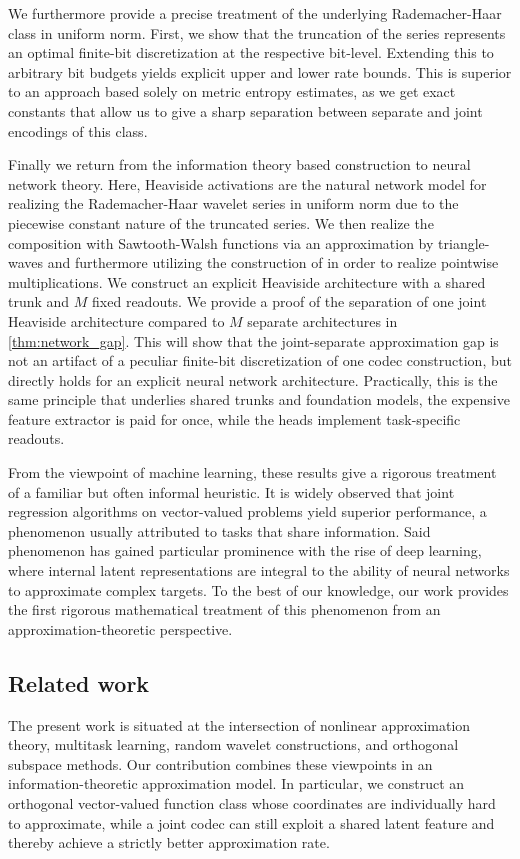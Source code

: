 \documentclass[twoside,11pt]{article}
\begin{document}
We furthermore provide a precise treatment of the underlying Rademacher-Haar class in uniform norm.
First, we show that the truncation of the series represents an optimal finite-bit discretization at the respective bit-level.
Extending this to arbitrary bit budgets yields explicit upper and lower rate bounds.
This is superior to an approach based solely on metric entropy estimates, as we get exact constants that allow us to give a sharp separation between separate and joint encodings of this class. 


Finally we return from the information theory based construction to neural network theory.
Here, Heaviside activations are the natural network model for realizing the Rademacher-Haar wavelet series in uniform norm due to the piecewise constant nature of the truncated series.
We then realize the composition with Sawtooth-Walsh functions via an approximation by triangle-waves and furthermore utilizing the construction of \cite{Yarotsky17ErrorBoundsApproximations} in order to realize pointwise multiplications. We construct an explicit Heaviside architecture with a shared trunk and $M$ fixed readouts. We provide a proof of the separation of one joint Heaviside architecture compared to $M$ separate architectures in \cref{thm:network_gap}.
This will show that the joint-separate approximation gap is not an artifact of a peculiar finite-bit discretization of one codec construction, but directly holds for an explicit neural network architecture.
Practically, this is the same principle that underlies shared trunks and foundation models, the expensive feature extractor is paid for once, while the heads implement task-specific readouts.


From the viewpoint of machine learning, these results give a rigorous treatment of a familiar but often informal heuristic.
It is widely observed that joint regression algorithms on vector-valued problems yield superior performance, a phenomenon usually attributed to tasks that share information.
Said phenomenon has gained particular prominence with the rise of deep learning, where internal latent representations are integral to the ability of neural networks to approximate complex targets.
To the best of our knowledge, our work provides the first rigorous mathematical treatment of this phenomenon from an approximation-theoretic perspective.

\subsection{Related work}
The present work is situated at the intersection of nonlinear approximation theory, multitask learning, random wavelet constructions, and orthogonal subspace methods. Our contribution combines these viewpoints in an information-theoretic approximation model. In particular, we construct an orthogonal vector-valued function class whose coordinates are individually hard to approximate, while a joint codec can still exploit a shared latent feature and thereby achieve a strictly better approximation rate.
\end{document}
